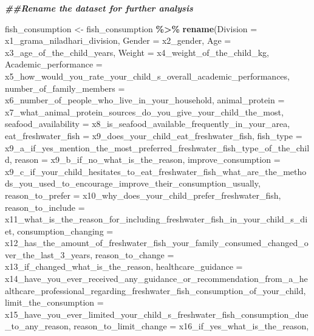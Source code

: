 \documentclass[
]{article}
\newenvironment{Shaded}{\begin{snugshade}}{\end{snugshade}}
\newcommand{\AttributeTok}[1]{\textcolor[rgb]{0.13,0.29,0.53}{#1}}
\newcommand{\DocumentationTok}[1]{\textcolor[rgb]{0.56,0.35,0.01}{\textbf{\textit{#1}}}}
\newcommand{\FunctionTok}[1]{\textcolor[rgb]{0.13,0.29,0.53}{\textbf{#1}}}
\newcommand{\NormalTok}[1]{#1}
\newcommand{\OtherTok}[1]{\textcolor[rgb]{0.56,0.35,0.01}{#1}}
\newcommand{\SpecialCharTok}[1]{\textcolor[rgb]{0.81,0.36,0.00}{\textbf{#1}}}
\begin{document}
\begin{Shaded}
\begin{Highlighting}[]
\DocumentationTok{\#\#Rename the dataset for further analysis}

\NormalTok{fish\_consumption }\OtherTok{\textless{}{-}}\NormalTok{ fish\_consumption }\SpecialCharTok{\%\textgreater{}\%}
\FunctionTok{rename}\NormalTok{(}\AttributeTok{Division =}\NormalTok{ x1\_grama\_niladhari\_division,}
       \AttributeTok{Gender =}\NormalTok{ x2\_gender,}
       \AttributeTok{Age =}\NormalTok{ x3\_age\_of\_the\_child\_years,}
       \AttributeTok{Weight =}\NormalTok{ x4\_weight\_of\_the\_child\_kg,}
       \AttributeTok{Academic\_performance =}\NormalTok{ x5\_how\_would\_you\_rate\_your\_child\_s\_overall\_academic\_performances,}
       \AttributeTok{number\_of\_family\_members =}\NormalTok{ x6\_number\_of\_people\_who\_live\_in\_your\_household,}
       \AttributeTok{animal\_protein =}\NormalTok{  x7\_what\_animal\_protein\_sources\_do\_you\_give\_your\_child\_the\_most,}
       \AttributeTok{seafood\_availability =}\NormalTok{ x8\_is\_seafood\_available\_frequently\_in\_your\_area,}
       \AttributeTok{eat\_freshwater\_fish =}\NormalTok{ x9\_does\_your\_child\_eat\_freshwater\_fish,}
       \AttributeTok{fish\_type =}\NormalTok{ x9\_a\_if\_yes\_mention\_the\_most\_preferred\_freshwater\_fish\_type\_of\_the\_child,}
       \AttributeTok{reason =}\NormalTok{ x9\_b\_if\_no\_what\_is\_the\_reason,}
       \AttributeTok{improve\_consumption =}\NormalTok{ x9\_c\_if\_your\_child\_hesitates\_to\_eat\_freshwater\_fish\_what\_are\_the\_methods\_you\_used\_to\_encourage\_improve\_their\_consumption\_usually,}
       \AttributeTok{reason\_to\_prefer =}\NormalTok{ x10\_why\_does\_your\_child\_prefer\_freshwater\_fish,}
       \AttributeTok{reason\_to\_include =}\NormalTok{  x11\_what\_is\_the\_reason\_for\_including\_freshwater\_fish\_in\_your\_child\_s\_diet,}
       \AttributeTok{consumption\_changing =}\NormalTok{ x12\_has\_the\_amount\_of\_freshwater\_fish\_your\_family\_consumed\_changed\_over\_the\_last\_3\_years,}
       \AttributeTok{reason\_to\_change =}\NormalTok{ x13\_if\_changed\_what\_is\_the\_reason,}
       \AttributeTok{healthcare\_guidance =}\NormalTok{ x14\_have\_you\_ever\_received\_any\_guidance\_or\_recommendation\_from\_a\_healthcare\_professional\_regarding\_freshwater\_fish\_consumption\_of\_your\_child,}
       \AttributeTok{limit\_the\_consumption =}\NormalTok{ x15\_have\_you\_ever\_limited\_your\_child\_s\_freshwater\_fish\_consumption\_due\_to\_any\_reason,}
       \AttributeTok{reason\_to\_limit\_change =}\NormalTok{ x16\_if\_yes\_what\_is\_the\_reason,}

\end{Highlighting}
\end{Shaded}
\end{document}
